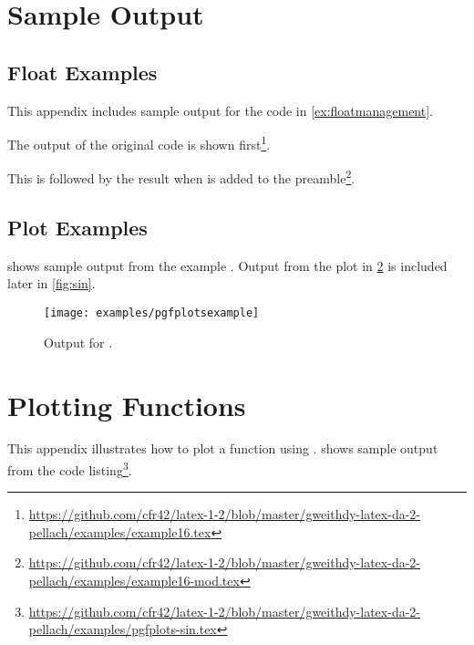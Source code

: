 
\section<1-| beamer:0>{Sample Output}\label{sec:samples}

\subsection<1-| beamer:0>{Float Examples}\label{subsec:samples-floats}
This appendix includes sample output for the code in \cref{ex:floatmanagement}.

The output of the original code is shown first\footnote{\url{https://github.com/cfr42/latex-1-2/blob/master/gweithdy-latex-da-2-pellach/examples/example16.tex}}.

This is followed by the result when  is added to the preamble\footnote{\url{https://github.com/cfr42/latex-1-2/blob/master/gweithdy-latex-da-2-pellach/examples/example16-mod.tex}}.



\subsection<1-| beamer:0>{Plot Examples}\label{subsec:samples-plots}
 shows sample output from the \pgfplots{} example .
Output from the plot in \cref{sec:fn} is included later in \cref{fig:sin}.
\begin{figure}
  \centering\texttt{[image: examples/pgfplotsexample]}
  \caption{Output for .}\label{fig:pgfplotsexample}
\end{figure}


\section<1-| beamer:0>{Plotting Functions}\label{sec:fn}

This appendix illustrates how to plot a function using \pgfplots.
 shows sample output from the code listing\footnote{\url{https://github.com/cfr42/latex-1-2/blob/master/gweithdy-latex-da-2-pellach/examples/pgfplots-sin.tex}}.


